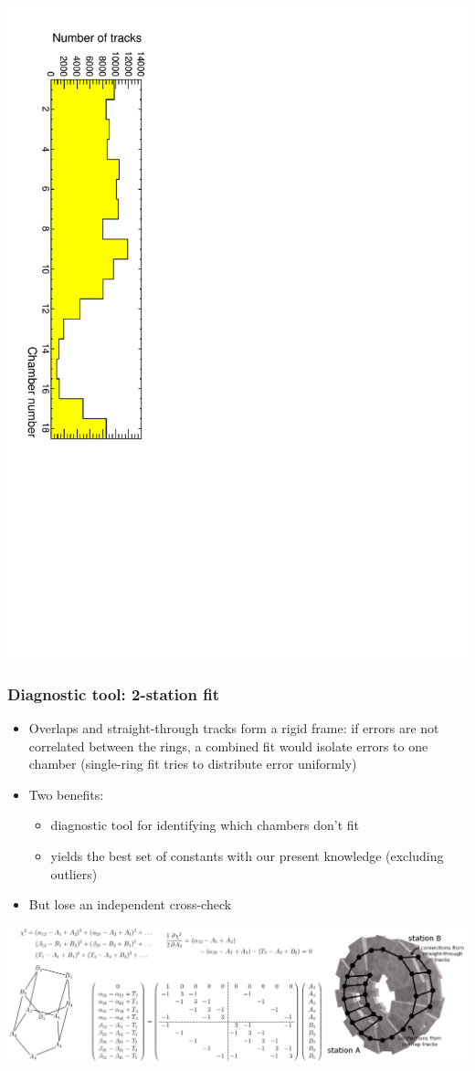 \documentclass[compress]{beamer}
\begin{document}
\begin{frame}
\begin{center}
\includegraphics[height=0.75\linewidth, angle=90]{statistics.pdf}
\end{center}
\end{frame}

\begin{frame}
\frametitle{Diagnostic tool: 2-station fit}
\small

\begin{itemize}
\item Overlaps and straight-through tracks form a rigid frame: if errors are
not correlated between the rings, a combined fit would isolate errors
to one chamber (single-ring fit tries to distribute error uniformly)
\item Two benefits:
\begin{itemize}
\item diagnostic tool for identifying which chambers don't fit
\item yields the best set of constants with our present knowledge (excluding outliers)
\end{itemize}
\item But lose an independent cross-check
\end{itemize}

\vfill
\includegraphics[width=\linewidth]{matrix_description.png}
\end{frame}
\end{document}
